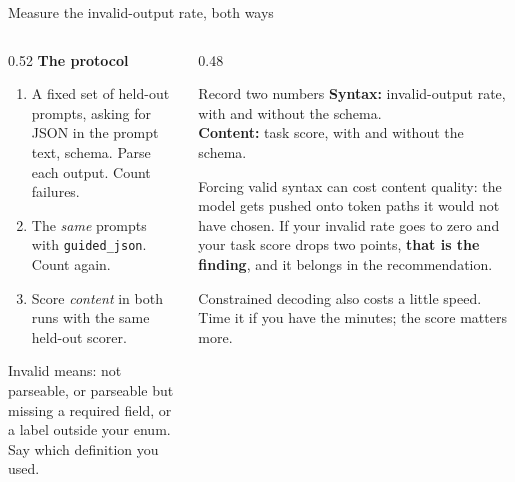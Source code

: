 \documentclass[aspectratio=169,10pt]{beamer}
\begin{document}
\fi
\begin{frame}{Measure the invalid-output rate, both ways}
  \begin{columns}[T]
    \begin{column}{0.52\textwidth}
      \textbf{The protocol}
      \begin{enumerate}
        \item A fixed set of held-out prompts, asking for JSON in the prompt
          text,  schema. Parse each output. Count failures.
        \item The \emph{same} prompts with \texttt{guided\_json}. Count again.
        \item Score \emph{content} in both runs with the same held-out scorer.
      \end{enumerate}
      \vspace{0.5em}
      Invalid means: not parseable, or parseable but missing a required field,
      or a label outside your enum. Say which definition you used.
    \end{column}
    \begin{column}{0.48\textwidth}
      \begin{block}{Record two numbers}
        \small
        \textbf{Syntax:} invalid-output rate, with and without the schema.\\[0.4em]
        \textbf{Content:} task score, with and without the schema.
      \end{block}
      \vspace{0.4em}
      \small
      Forcing valid syntax can cost content quality: the model gets pushed onto
      token paths it would not have chosen. If your invalid rate goes to zero
      and your task score drops two points, \textbf{that is the finding}, and
      it belongs in the recommendation.
      \vspace{0.3em}

      Constrained decoding also costs a little speed. Time it if you have the
      minutes; the score matters more.
    \end{column}
  \end{columns}
\end{frame}
\end{document}
